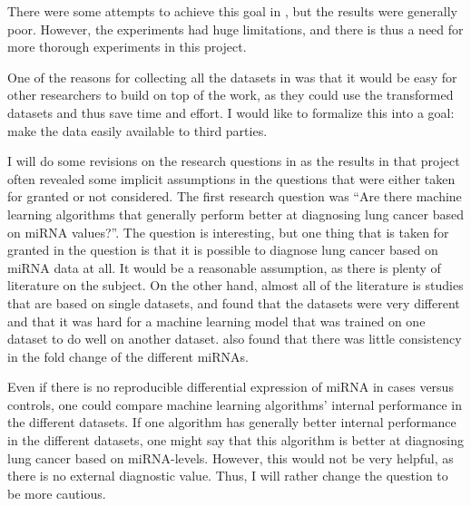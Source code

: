 There were some attempts to achieve this goal in \citet{forprosjekt}, but the results were generally poor. However, the experiments had huge limitations, and there is thus a need for more thorough experiments in this project.

One of the reasons for collecting all the datasets in \citet{forprosjekt} was that it would be easy for other researchers to build on top of the work, as they could use the transformed datasets and thus save time and effort. I would like to formalize this into a goal: make the data easily available to third parties.


I will do some revisions on the research questions in \citet{forprosjekt} as the results in that project often revealed some implicit assumptions in the questions that were either taken for granted or not considered. The first research question was ``Are there machine learning algorithms that generally perform better at diagnosing lung cancer based on miRNA values?''. The question is interesting, but one thing that is taken for granted in the question is that it is possible to diagnose lung cancer based on miRNA data at all. It would be a reasonable assumption, as there is plenty of literature on the subject. On the other hand, almost all of the literature is studies that are based on single datasets, and \citeauthor{forprosjekt} found that the datasets were very different and that it was hard for a machine learning model that was trained on one dataset to do well on another dataset. \citeauthor{forprosjekt} also found that there was little consistency in the fold change of the different miRNAs. 

Even if there is no reproducible differential expression of miRNA in cases versus controls, one could compare machine learning algorithms' internal performance in the different datasets. If one algorithm has generally better internal performance in the different datasets, one might say that this algorithm is better at diagnosing lung cancer based on miRNA-levels. However, this would not be very helpful, as there is no external diagnostic value. Thus, I will rather change the question to be more cautious.
\iffalse
Machine learning seems to be able to well internally in single datasets. Then one can explore whether one machine learning algorithm does well in more datasets than another machine learning algorithm, and thus proclaim one machine learning algorithm ``better'' than another at diagnosing lung cancer based on miRNAs, but that would not be very helpful as the model would not be able to generalize outside of a single dataset. Therefore, I will have a more cautious first research question this time.
\fi

